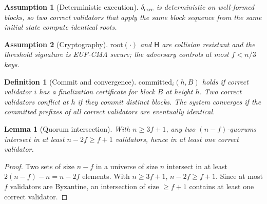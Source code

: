 \documentclass[journal]{IEEEtran}
\newtheorem{lemma}{Lemma}
\newtheorem{definition}{Definition}
\newtheorem{assumption}{Assumption}
\begin{document}
\begin{assumption}[Deterministic execution]
\label{as:exec}
$\delta_{\mathrm{exec}}$ is deterministic on well-formed blocks, so two correct validators
that apply the same block sequence from the same initial state compute identical roots.
\end{assumption}

\begin{assumption}[Cryptography]
\label{as:crypto}
$\mathrm{root}(\cdot)$ and $\mathsf{H}$ are collision resistant and the threshold signature is
EUF-CMA secure; the adversary controls at most $f<n/3$ keys.
\end{assumption}

\begin{definition}[Commit and convergence]
\label{def:commit}
$\mathrm{committed}_i(h,B)$ holds if correct validator $i$ has a finalization certificate for
block $B$ at height $h$. Two correct validators \emph{conflict} at $h$ if they commit distinct
blocks. The system \emph{converges} if the committed prefixes of all correct validators are
eventually identical.
\end{definition}

\begin{lemma}[Quorum intersection]
\label{lem:qi}
With $n\ge 3f+1$, any two $(n-f)$-quorums intersect in at least $n-2f\ge f+1$ validators, hence
in at least one correct validator.
\end{lemma}
\begin{proof}
Two sets of size $n-f$ in a universe of size $n$ intersect in at least $2(n-f)-n = n-2f$
elements. With $n\ge 3f+1$, $n-2f\ge f+1$. Since at most $f$ validators are Byzantine, an
intersection of size $\ge f+1$ contains at least one correct validator.
\end{proof}
\end{document}

